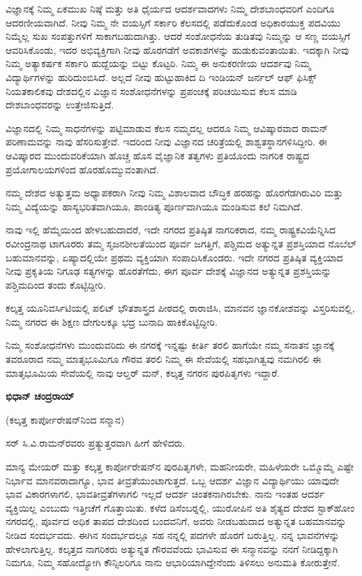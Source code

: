 ವಿಜ್ಞಾನಕ್ಕೆ ನಿಮ್ಮ ಏಕಮುಖ ನಿಷ್ಠೆ ಮತ್ತು ಅತಿ ಧೈರ್ಯದ ಆದರ್ಶವಾದಗಳು ನಿಮ್ಮ ದೇಶಬಾಂಧವರಿಗೆ ಎಂದಿಗೂ ಆದರಣೀಯವಾಗಿದೆ. ನೀವು ನಿಮ್ಮ ನೇ ವಯಸ್ಸಿಗೆ ಸರ್ಕಾರಿ ಕೆಲಸದಲ್ಲಿ ಪಡೆದುಕೊಂಡ ಅಧಿಕಾರಯುಕ್ತ ಪದವಿಯು ನಿಮ್ಮೆಲ್ಲ ಸುಖ ಸಂಪತ್ತುಗಳಿಗೆ ಸಾಕಾಗಬಹುದಾಗಿತ್ತು. ಆದರೆ ಸಂಶೋಧನೆಯ ತುಡಿತವು ನಿಮ್ಮನ್ನು ಆ ಸಣ್ಣ ವಯಸ್ಸಿಗೆ ಆವರಿಸಿಕೊಂಡು, ಇದರ ಅಭಿವ್ಯಕ್ತಿಗಾಗಿ ನೀವು ಹೊರಗಡೆಗೆ ಅವಕಾಶಗಳನ್ನು ಹುಡುಕುವಂತಾಯಿತು. ಇದಕ್ಕಾಗಿ ನೀವು ನಿಮ್ಮ ಅತ್ಯಾಕರ್ಷಕ ಸರ್ಕಾರಿ ಹುದ್ದೆಯನ್ನು ಬಿಟ್ಟು ಕೊಟ್ಟರಿ. ನಿಮ್ಮ ಈ ಅನುಕರಣೀಯ ಆದರ್ಶವು ನಿಮ್ಮ ವಿದ್ಯಾರ್ಥಿಗಳನ್ನು ಹುರಿದುಂಬಿಸಿದೆ. ಅಲ್ಲದೆ ನೀವು ಹುಟ್ಟುಹಾಕಿದ ದಿ ಇಂಡಿಯನ್ ಜರ್ನಲ್ ಆಫ್ ಫಿಸಿಕ್ಸ್ ನಿಯತಕಾಲಿಕವು ದೇಶದಲ್ಲಿನ ವಿಜ್ಞಾನ ಸಂಶೋಧನೆಗಳನ್ನು ಪ್ರಪಂಚಕ್ಕೆ ಪರಿಚಯಿಸುವ ಕೆಲಸ ಮಾಡಿ ದೇಶಬಾಂಧವರನ್ನು ಉತ್ತೇಜಿಸುತ್ತಿದೆ.

ವಿಜ್ಞಾನದಲ್ಲಿ ನಿಮ್ಮ ಸಾಧನೆಗಳನ್ನು ಪಟ್ಟಿಮಾಡುವ ಕೆಲಸ ನಮ್ಮದಲ್ಲ ಆದರೂ ನಿಮ್ಮ ಆವಿಷ್ಕಾರವಾದ ರಾಮನ್ ಪರಿಣಾಮವನ್ನು ನಾವು ಹೆಸರಿಸುತ್ತೇವೆ. ಇದರಿಂದ ನೀವು ವಿಜ್ಞಾನದ ಚರಿತ್ರೆಯಲ್ಲಿ ಶಾಶ್ವತಸ್ಥಾನಗಳಿಸಿದ್ದೀರಿ. ಈ ಆವಿಷ್ಕಾರದ ಮುಂದುವರಿಕೆಯಾಗಿ ಹೊಚ್ಚ ಹೊಸ ವೈಜ್ಞಾನಿಕ ತತ್ವಗಳು ಪ್ರತಿಯೊಂದು ನಾಗರಿಕ ರಾಷ್ಟ್ರದ ಪ್ರಯೋಗಾಲಯಗಳಿಂದ ಹೊರಹೊಮ್ಮುವಂತಾಗಿದೆ.

ನಮ್ಮ ದೇಶದ ಅತ್ಯುತ್ತಮ ಅಧ್ಯಾಪಕರಾಗಿ ನೀವು ನಿಮ್ಮ ವಿಶಾಲವಾದ ಬೌದ್ಧಿಕ ಹರಹನ್ನು ಹೊರಗೆಡಗಿರುವಿರಿ ಮತ್ತು ನಿಮ್ಮ ವಿದ್ಯೆಯನ್ನು ಹಾಸ್ಯಭರಿತವಾಗಿಯೂ, ಪಾಂಡಿತ್ಯ ಪೂರ್ಣವಾಗಿಯೂ ಮಂಡಿಸುವ ಕಲೆ ನಿಮಗಿದೆ.

ನಾವು ಇಲ್ಲಿ ಹೆಮ್ಮೆಯಿಂದ ಹೇಳಬಹುದಾದರೆ, ಇದೇ ನಗರದ ಪ್ರತಿಷ್ಠಿತ ನಾಗರಿಕರಾದ, ನಮ್ಮ ರಾಷ್ಟ್ರಕವಿಯೆನ್ನಿಸಿದ ರವೀಂದ್ರನಾಥ ಟಾಗೂರರು ತಮ್ಮ ಸೃಜನಶೀಲತೆಯಿಂದ ಪೂರ್ವ ಜಗತ್ತಿಗೆ, ಪಶ್ಚಿಮದ ಅತ್ಯುನ್ನತ ಪ್ರಶಸ್ತಿಯಾದ ನೊಬೆಲ್ ಬಹುಮಾನವನ್ನು, ಏಷ್ಯಾದಲ್ಲಿಯೇ ಪ್ರಥಮ ವ್ಯಕ್ತಿಯಾಗಿ ಸಂಪಾದಿಸಿಕೊಂಡರು. ಇದೇ ನಗರದ ಪ್ರತಿಷ್ಠಿತ ವ್ಯಕ್ತಿಯಾದ ನೀವು ಪ್ರಕೃತಿಯ ನಿಗೂಢ ಸತ್ಯಗಳನ್ನು ಹೊರತೆಗೆದು, ಈಗ ಪೂರ್ವ ದೇಶಕ್ಕೆ ವಿಜ್ಞಾನದ ಅತ್ಯುನ್ನತ ಪ್ರಶಸ್ತಿಯನ್ನು ಪಶ್ಚಿಮದಿಂದ ತಂದು ಕೊಟ್ಟಿದ್ದೀರಿ.

ಕಲ್ಕತ್ತ ಯೂನಿವರ್ಸಿಟಿಯಲ್ಲಿ ಪಲಿಟ್ ಭೌತಶಾಸ್ತ್ರದ ಪೀಠದಲ್ಲಿ ರಾರಾಜಿಸಿ, ಮಾನವನ ಜ್ಞಾನಕೋಶವನ್ನು ವಿಸ್ತರಿಸುವಲ್ಲಿ, ನಿಮ್ಮ ನಗರದ ಈ ಶಿಕ್ಷಣ ದೇಗುಲಕ್ಕೂ ಭದ್ರ ಬುನಾದಿ ಹಾಕಿಕೊಟ್ಟಿದ್ದೀರಿ.

ನಿಮ್ಮ ಸಂಶೋಧನೆಗಳು ಮುಂದುವರಿದು ಈ ನಗರಕ್ಕೆ ಇನ್ನಷ್ಟು ಕೀರ್ತಿ ತರಲಿ ಹಾಗೆಯೇ ನಮ್ಮ ಸನಾತನ ಜ್ಞಾನಕ್ಕೆ ತವರೂರಾದ ನಮ್ಮ ಮಾತೃಭೂಮಿಗೂ ಗೌರವ ತರಲಿ ನಿಮ್ಮ ಈ ಸೇವೆಯಲ್ಲಿ ಸಹಭಾಗಿತ್ವವು ನಮಗಿರಲಿ ಈ ಮಾತೃಭೂಮಿಯ ಸೇವೆಯಲ್ಲಿ ನಾವು ಆಲ್ಡರ್ ಮನ್, ಕಲ್ಕತ್ತ ನಗರನ ಪುರಪಿತೃಗಳು ಇದ್ದಾರೆ.

\begin{flushright}
\textbf{ಭಿಧಾನ್ ಚಂದ್ರರಾಯ್}
\end{flushright}

\newpage

(ಕಲ್ಕತ್ತ ಕಾರ್ಪೋರೇಷನ್‍ನಿಂದ ಸನ್ಮಾನ)

ಸರ್ ಸಿ.ವಿ.ರಾಮನ್‍ರವರು ಪ್ರತ್ಯುತ್ತರವಾಗಿ ಹೀಗೆ ಹೇಳಿದರು.

ಮಾನ್ಯ ಮೇಯರ್ ಮತ್ತು ಕಲ್ಕತ್ತ ಕಾರ್ಪೋರೇಷನ್‍ನ ಪುರಪಿತೃಗಳೇ, ಮಹನೀಯರೇ, ಮಹಿಳೆಯರೇ ಒಮ್ಮೊಮ್ಮೆ ಎಷ್ಟೇ ನಿರ್ಭಾವ ಮಾನವರಾದಾಗ್ಯೂ, ಭಾವ ತೀವ್ರತೆಯುಂಟಾಗುತ್ತದೆ. ಒಬ್ಬ ಆದರ್ಶ ವಿಜ್ಞಾನ ವಿದ್ಯಾರ್ಥಿಯು ಯಾವುದೇ ಭಾವ ವಿಕಾರಗಳಾಗಲಿ, ಭಾವತೀವ್ರತೆಗಳಾಗಲಿ ಇಲ್ಲದೆ ಆದರ್ಶ ಚಿಂತಕನಾಗಿರಬೇಕು. ನಾನು ಇಂತಹ ಆದರ್ಶ ವ್ಯಕ್ತಿಯಿಲ್ಲ ಎಂಬುದು ಇತ್ತೀಚೆಗೆ ಗೊತ್ತಾಯಿತು. ಕಳೆದ ಡಿಸೆಂಬರ್‍ನಲ್ಲಿ, ಯುರೋಪಿನ ಅತಿ ಶೈತ್ಯದ ದೇಶದ ಸ್ಟಾಕ್‍ಹೋಂ ನಗರದಲ್ಲಿ, ಪೂರ್ವದ ಅಧಿಕ ತಾಪದ ದೇಶದಿಂದ ಬಂದವನಿಗೆ, ಅವರು ನೀಡಬಹುದಾದ ಅತ್ಯುನ್ನತ ಬಹಮಾನವನ್ನು ನೀಡಿದ ಸಂದರ್ಭವದು. ಈಗಿನ ಸಂದರ್ಭದಲ್ಲೂ ಸಹ ನನ್ನಲ್ಲಿ ಪದಗಳೇ ಹೊರಗೆ ಬರುತ್ತಿಲ್ಲ. ನನ್ನ ಭಾವನೆಗಳನ್ನು ಹೇಳಲಾಗುತ್ತಿಲ್ಲ. ಕಲ್ಕತ್ತದ ನಾಗರಿಕರು ಅತ್ಯುನ್ನತ ಗೌರವವೆಂದು ಭಾವಿಸುವ ಈ ಸನ್ಮಾನವನ್ನು ನನಗೆ ನೀಡಿದ್ದಕ್ಕಾಗಿ ನಿಮಗೂ, ನಿಮ್ಮ ಸಹೋದ್ಯೋಗಿ ಕೌನ್ಸಿಲರಿಗೂ ನಾನು ಆಭಾರಿಯಾಗಿದ್ದೇನೆಂದು ತಿಳಿಸಲು ಅನುಮತಿ ಕೋರುತ್ತೇನೆ.

